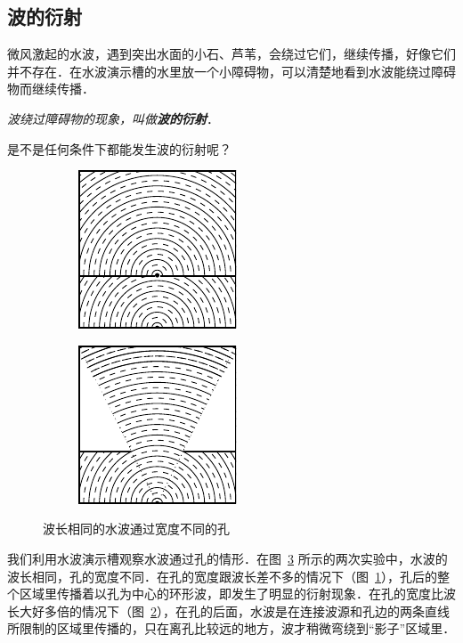 \subsection{波的衍射}

微风激起的水波，遇到突出水面的小石、芦苇，会绕过它们，继续传播，好像它们并不存在．在水波演示槽的水里放一个小障碍物，可以清楚地看到水波能绕过障碍物而继续传播．

\textit{波绕过障碍物的现象，叫做\textbf{波的衍射}}．

是不是任何条件下都能发生波的衍射呢？
\begin{figure}[htbp]
    \centering
    \begin{subfigure}{0.45\linewidth}
        \centering
        \includegraphics{fig/A/9-24a.pdf}
        \caption{}\label{fig_A_9-24a}
    \end{subfigure}
    \hfil
    \begin{subfigure}{0.45\linewidth}
        \centering
        \includegraphics{fig/A/9-24b.pdf}
        \caption{}\label{fig_A_9-24b}
    \end{subfigure}
    \caption{波长相同的水波通过宽度不同的孔}\label{fig_A_9-24}
\end{figure}


我们利用水波演示槽观察水波通过孔的情形．在图~\ref{fig_A_9-24} 所示的两次实验中，水波的波长相同，孔的宽度不同．在孔的宽度跟波长差不多的情况下（图~\ref{fig_A_9-24a}），孔后的整个区域里传播着以孔为中心的环形波，即发生了明显的衍射现象．在孔的宽度比波长大好多倍的情况下（图~\ref{fig_A_9-24b}），在孔的后面，水波是在连接波源和孔边的两条直线所限制的区域里传播的，只在离孔比较远的地方，波才稍微弯绕到“影子”区域里．


